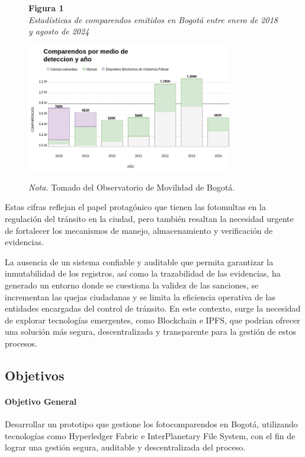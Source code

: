 \begin{figure}[htbp]
    \begin{flushleft}
        \textbf{Figura 1}\\
        \textit{Estadísticas de comparendos emitidos en Bogotá entre enero de 2018 y agosto de 2024}
    \end{flushleft}
    \centering
    \includegraphics[width=0.8\textwidth]{Images/numComparendos.png}
    \vspace{0.5em}
    \begin{flushleft}
        \textit{Nota.} Tomado del Observatorio de Movilidad de Bogotá.
    \end{flushleft}
    \label{fig:estadisticas_comparendos}
\end{figure}

Estas cifras reflejan el papel protagónico que tienen las fotomultas en la regulación del tránsito en la ciudad, pero también resaltan la necesidad urgente de fortalecer los mecanismos de manejo, almacenamiento y verificación de evidencias.  

La ausencia de un sistema confiable y auditable que permita garantizar la inmutabilidad de los registros, así como la trazabilidad de las evidencias, ha generado un entorno donde se cuestiona la validez de las sanciones, se incrementan las quejas ciudadanas y se limita la eficiencia operativa de las entidades encargadas del control de tránsito. En este contexto, surge la necesidad de explorar tecnologías emergentes, como Blockchain e IPFS, que podrían ofrecer una solución más segura, descentralizada y transparente para la gestión de estos procesos. 

\subsection{Objetivos}
\paragraph{Objetivo General}
Desarrollar un prototipo que gestione los fotocomparendos en Bogotá, utilizando tecnologías como Hyperledger Fabric e InterPlanetary File System, con el fin de lograr una gestión segura, auditable y descentralizada del proceso. 

